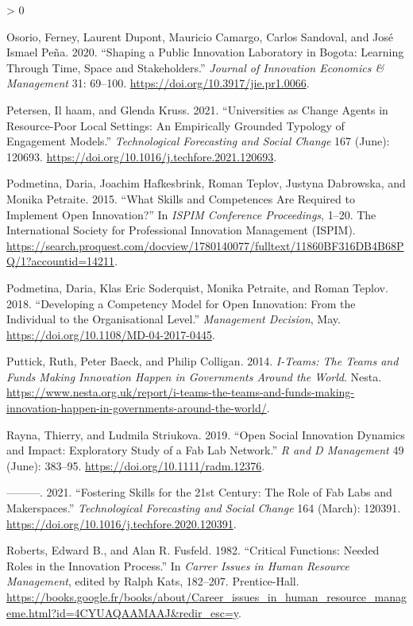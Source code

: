 \documentclass[AMA,STIX1COL,APA,STIX2COL]{WileyNJD-v2}
\newlength{\cslhangindent}
\newenvironment{CSLReferences}[2] %
 {%
  \setlength{\parindent}{0pt}
  \ifodd #1 \everypar{\setlength{\hangindent}{\cslhangindent}}\ignorespaces\fi
  \ifnum #2 > 0
  \setlength{\parskip}{#2\baselineskip}
  \fi
 }%
 {}
\begin{document}
\begin{CSLReferences}{1}{0}
\leavevmode\hypertarget{ref-Osorio2020}{}%
Osorio, Ferney, Laurent Dupont, Mauricio Camargo, Carlos Sandoval, and
José Ismael Peña. 2020. {``Shaping a Public Innovation Laboratory in
Bogota: Learning Through Time, Space and Stakeholders.''} \emph{Journal
of Innovation Economics \& Management} 31: 69--100.
\url{https://doi.org/10.3917/jie.pr1.0066}.

\leavevmode\hypertarget{ref-Petersen2021}{}%
Petersen, Il haam, and Glenda Kruss. 2021. {``Universities as Change
Agents in Resource-Poor Local Settings: An Empirically Grounded Typology
of Engagement Models.''} \emph{Technological Forecasting and Social
Change} 167 (June): 120693.
\url{https://doi.org/10.1016/j.techfore.2021.120693}.

\leavevmode\hypertarget{ref-Podmetina2015}{}%
Podmetina, Daria, Joachim Hafkesbrink, Roman Teplov, Justyna Dabrowska,
and Monika Petraite. 2015. {``What Skills and Competences Are Required
to Implement Open Innovation?''} In \emph{ISPIM Conference Proceedings},
1--20. The International Society for Professional Innovation Management
(ISPIM).
\url{https://search.proquest.com/docview/1780140077/fulltext/11860BF316DB4B68PQ/1?accountid=14211}.

\leavevmode\hypertarget{ref-Podmetina2018}{}%
Podmetina, Daria, Klas Eric Soderquist, Monika Petraite, and Roman
Teplov. 2018. {``Developing a Competency Model for Open Innovation: From
the Individual to the Organisational Level.''} \emph{Management
Decision}, May. \url{https://doi.org/10.1108/MD-04-2017-0445}.

\leavevmode\hypertarget{ref-Puttick2014-Teams}{}%
Puttick, Ruth, Peter Baeck, and Philip Colligan. 2014. \emph{I-Teams:
The Teams and Funds Making Innovation Happen in Governments Around the
World}. Nesta.
\url{https://www.nesta.org.uk/report/i-teams-the-teams-and-funds-making-innovation-happen-in-governments-around-the-world/}.

\leavevmode\hypertarget{ref-Rayna2019}{}%
Rayna, Thierry, and Ludmila Striukova. 2019. {``Open Social Innovation
Dynamics and Impact: Exploratory Study of a Fab Lab Network.''} \emph{R
and D Management} 49 (June): 383--95.
\url{https://doi.org/10.1111/radm.12376}.

\leavevmode\hypertarget{ref-Rayna2021}{}%
---------. 2021. {``Fostering Skills for the 21st Century: The Role of
Fab Labs and Makerspaces.''} \emph{Technological Forecasting and Social
Change} 164 (March): 120391.
\url{https://doi.org/10.1016/j.techfore.2020.120391}.

\leavevmode\hypertarget{ref-Roberts1982}{}%
Roberts, Edward B., and Alan R. Fusfeld. 1982. {``Critical Functions:
Needed Roles in the Innovation Process.''} In \emph{Carrer Issues in
Human Resource Management}, edited by Ralph Kats, 182--207.
Prentice-Hall.
\url{https://books.google.fr/books/about/Career_issues_in_human_resource_manageme.html?id=4CYUAQAAMAAJ\&redir_esc=y}.


\end{CSLReferences}
\end{document}
